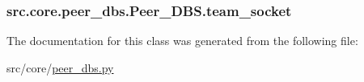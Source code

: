 \subsubsection[{team\+\_\+socket}]{\setlength{\rightskip}{0pt plus 5cm}src.\+core.\+peer\+\_\+dbs.\+Peer\+\_\+\+D\+B\+S.\+team\+\_\+socket}\label{classsrc_1_1core_1_1peer__dbs_1_1Peer__DBS_acf4415c5d44af6904b83bfe873c4b0c7}


The documentation for this class was generated from the following file\+:\begin{DoxyCompactItemize}
\item 
src/core/\hyperlink{peer__dbs_8py}{peer\+\_\+dbs.\+py}\end{DoxyCompactItemize}
